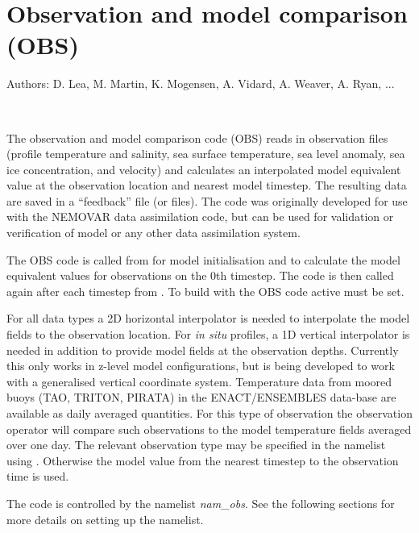 \chapter{Observation and model comparison (OBS)}
\label{OBS}

Authors: D. Lea, M. Martin, K. Mogensen, A. Vidard, A. Weaver, A. Ryan, ...   %

\minitoc


\newpage
$\ $\newline    %

The observation and model comparison code (OBS) reads in observation files (profile
temperature and salinity, sea surface temperature, sea level anomaly, sea ice concentration,
and velocity) and calculates  an interpolated model equivalent value at the observation
location and nearest model timestep. The resulting data are saved in a ``feedback'' file (or
files). The code was originally developed for use with the NEMOVAR data assimilation code, but
can be used for validation or verification of model or  any other data assimilation system.

The OBS code is called from  for model initialisation and to calculate the model
equivalent values for observations on the 0th timestep. The code is then called again after
each timestep from . To build with the OBS code active  must be
set.

For all data types a 2D horizontal  interpolator is needed to interpolate the model fields to
the observation location. For {\em in situ} profiles, a 1D vertical interpolator is needed in
addition to provide model fields at the observation depths. Currently this only works in
z-level model configurations, but is being developed to work with a generalised vertical
coordinate system. Temperature data from moored buoys (TAO, TRITON, PIRATA) in the
ENACT/ENSEMBLES data-base are available as daily averaged quantities. For this type of
observation the observation operator will compare such observations to the model temperature
fields averaged over one day. The relevant observation type may be specified in the namelist
using . Otherwise the model value from the nearest timestep to the
observation time is used.

The code is controlled by the namelist \textit{nam\_obs}. See the following sections for more
details on setting up the namelist. 

